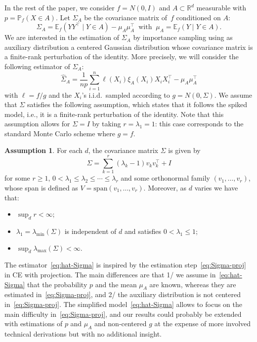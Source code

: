 \documentclass[]{article}
\newcommand{\E}{\mathbb{E}}
\renewcommand{\P}{\mathbb{P}}
\newcommand{\R}{\mathbb{R}}
\theoremstyle{plain}
\theoremstyle{definition}
\newtheorem{assumption}{Assumption}
\begin{document}
In the rest of the paper, we consider $f = N(0,I)$ and $A \subset \R^d$ measurable with $p = \P_f(X \in A)$. Let $\Sigma_A$ be the covariance matrix of~$f$ conditioned on $A$:
\[ \Sigma_A = \E_f( Y Y^\top \mid Y \in A) - \mu_A \mu_A^\top \ \text{ with } \ \mu_A = \E_f(Y \mid Y \in A). \]
We are interested in the estimation of $\Sigma_A$ by importance sampling using as auxiliary distribution a centered Gaussian distribution whose covariance matrix is a finite-rank perturbation of the identity. More precisely, we will consider the following estimator of $\Sigma_A$:
\begin{equation} \label{eq:hat-Sigma}
	\hat \Sigma_A = \frac{1}{np} \sum_{i=1}^n \ell(X_i) \xi_A(X_i) X_i X_i^\top - \mu_A \mu_A^\top
\end{equation}
with $\ell = f/g$ and the $X_i$'s i.i.d.\ sampled according to $g = N(0, \Sigma)$. We assume that $\Sigma$ satisfies the following assumption, which states that it follows the spiked model, i.e., it is a finite-rank perturbation of the identity. Note that this assumption allows for $\Sigma = I$ by taking $r = \lambda_1 = 1$: this case corresponds to the standard Monte Carlo scheme where $g = f$.

\begin{assumption} \label{ass:Sigma}
	For each $d$, the covariance matrix $\Sigma$ is given by
	\begin{equation} \label{eq:Sigma}
		\Sigma = \sum_{k=1}^r (\lambda_k - 1) v_k v_k^\top + I
	\end{equation}
	for some $r \geq 1$, $0 < \lambda_1 \leq \lambda_2 \leq \cdots \leq \lambda_r$ and some orthonormal family $(v_1, \ldots, v_r)$, whose span is defined as $V = \text{span}(v_1, \ldots, v_r)$. Moreover, as $d$ varies we have that:
	\begin{itemize}
		\item $\sup_d r < \infty$;
		\item $\lambda_1 = \lambda_{\min}(\Sigma)$ is independent of $d$ and satisfies $0 < \lambda_1 \leq 1$;
		\item $\sup_d \lambda_{\max}(\Sigma) < \infty$.
	\end{itemize}
\end{assumption}


The estimator~\eqref{eq:hat-Sigma} is inspired by the estimation step~\eqref{eq:Sigma-proj} in CE with projection. The main differences are that 1/ we assume in~\eqref{eq:hat-Sigma} that the probability $p$ and the mean $\mu_A$ are known, whereas they are estimated in~\eqref{eq:Sigma-proj}, and 2/ the auxiliary distribution is not centered in~\eqref{eq:Sigma-proj}. The simplified model~\eqref{eq:hat-Sigma} allows to focus on the main difficulty in~\eqref{eq:Sigma-proj}, and our results could probably be extended with estimations of $p$ and $\mu_A$ and non-centered $g$ at the expense of more involved technical derivations but with no additional insight.
\end{document}
